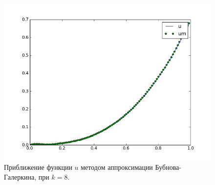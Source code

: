 \documentclass[12pt,a4paper,oneside]{extarticle}
\begin{document}
    \begin{figure}[ht!]
        \centering
        \includegraphics[scale=0.8]{k8.png}
        \caption{Приближение функции $u$ методом аппроксимации Бубнова-Галеркина, при $k = 8$.}
        \label{pic:k8}
    \end{figure}
\end{document}
